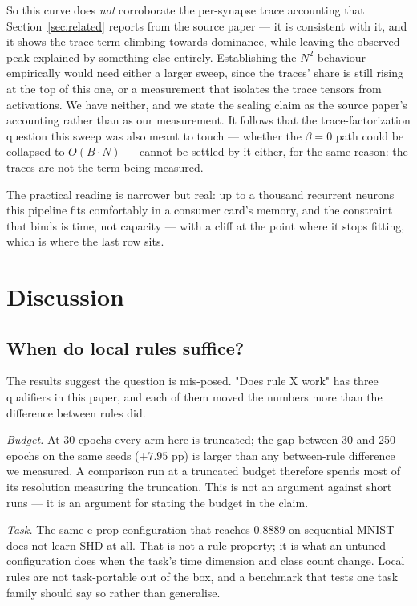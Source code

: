 \documentclass[11pt]{article}
\begin{document}
So this curve does \emph{not} corroborate the per-synapse trace accounting that
Section~\ref{sec:related} reports from the source paper --- it is consistent with
it, and it shows the trace term climbing towards dominance, while leaving the
observed peak explained by something else entirely. Establishing the $N^2$
behaviour empirically would need either a larger sweep, since the traces' share is
still rising at the top of this one, or a measurement that isolates the trace
tensors from activations. We have neither, and we state the scaling claim as the
source paper's accounting rather than as our measurement. It follows that the
trace-factorization question this sweep was also meant to touch --- whether the
$\beta = 0$ path could be collapsed to $O(B \cdot N)$ --- cannot be settled by it
either, for the same reason: the traces are not the term being measured.

The practical reading is narrower but real: up to a thousand recurrent neurons
this pipeline fits comfortably in a consumer card's memory, and the constraint
that binds is time, not capacity --- with a cliff at the point where it stops
fitting, which is where the last row sits.

\section{Discussion}
\label{sec:discussion}
\subsection{When do local rules suffice?}
The results suggest the question is mis-posed. "Does rule X work" has three
qualifiers in this paper, and each of them moved the numbers more than the
difference between rules did.

\emph{Budget.} At 30 epochs every arm here is truncated; the gap between 30 and
250 epochs on the same seeds ($+7.95$ pp) is larger than any between-rule
difference we measured. A comparison run at a truncated budget therefore spends
most of its resolution measuring the truncation. This is not an argument against
short runs --- it is an argument for stating the budget in the claim.

\emph{Task.} The same e-prop configuration that reaches 0.8889 on sequential
MNIST does not learn SHD at all. That is not a rule property; it is what an
untuned configuration does when the task's time dimension and class count
change. Local rules are not task-portable out of the box, and a benchmark that
tests one task family should say so rather than generalise.
\end{document}
